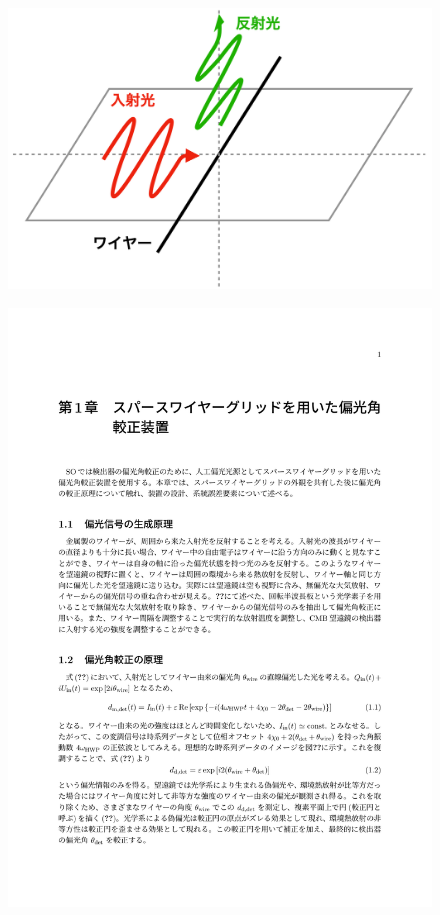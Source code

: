\documentclass[../../main.tex]{subfiles}
\begin{document}
\begin{figure}[H]
    \begin{minipage}[b]{0.48\columnwidth}
        \centering
        \includegraphics[width=\columnwidth]{wiregrid/wire_reflect.pdf}
        \subcaption{}
        \label{fig:wire_reflect}
    \end{minipage}
    \hspace{0.02\columnwidth}
    \begin{minipage}[b]{0.48\columnwidth}
        \centering
        \includegraphics[width=\columnwidth]{wiregrid/wiregrid}

\end{minipage}
\end{figure}
\end{document}
